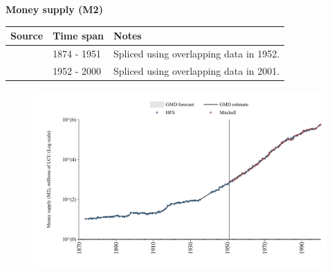 \documentclass[12pt,a4paper,landscape]{article}
\begin{document}
\begin{adjustbox}{max totalsize={\paperwidth}{\paperheight},center}
\begin{minipage}[t][\textheight][t]{\textwidth}
\vspace*{0.5cm}
{}
\begin{center}
{\Large\bfseries Money supply (M2)}
\end{center}
\vspace{0.5cm}
\begin{table}[H]
\centering
\small
\begin{tabular}{|l|l|l|}
\hline
\textbf{Source} & \textbf{Time span} & \textbf{Notes} \\
\hline
\rowcolor{white}\cite{HFS}& 1874 - 1951 &Spliced using overlapping data in 1952. \\
\rowcolor{lightgray}\cite{Mitchell}& 1952 - 2000 &Spliced using overlapping data in 2001. \\
\hline
\end{tabular}
\end{table}
\begin{figure}[H]
\centering
\includegraphics[width=\textwidth,height=0.6\textheight,keepaspectratio]{graphs/ESP_M2.pdf}
\end{figure}
\end{minipage}
\end{adjustbox}
\end{document}
